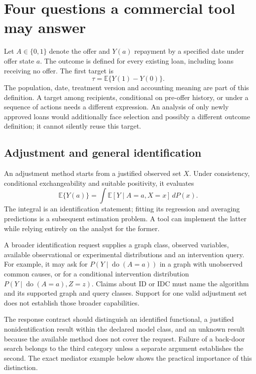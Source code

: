 \section{Four questions a commercial tool may answer}

Let $A\in\{0,1\}$ denote the offer and $Y(a)$ repayment by a specified date
under offer state $a$. The outcome is defined for every existing loan, including
loans receiving no offer. The first target is
\[
 \tau=\mathbb E\{Y(1)-Y(0)\}.
\]
The population, date, treatment version and accounting meaning are part of
this definition. A target among recipients, conditional on pre-offer history,
or under a sequence of actions needs a different expression. An analysis of
only newly approved loans would additionally face selection and possibly a
different outcome definition; it cannot silently reuse this target.

\subsection{Adjustment and general identification}

An adjustment method starts from a justified observed set $X$. Under consistency,
conditional exchangeability and suitable positivity, it evaluates
\[
 \mathbb E\{Y(a)\}
 =\int \mathbb E[Y\mid A=a,X=x]\,dP(x).
\]
The integral is an identification statement; fitting its regression and
averaging predictions is a subsequent estimation problem. A tool can implement
the latter while relying entirely on the analyst for the former.

A broader identification request supplies a graph class, observed variables,
available observational or experimental distributions and an intervention query.
For example, it may ask for $P(Y\mid\operatorname{do}(A=a))$ in a graph with
unobserved common causes, or for a conditional intervention distribution
$P(Y\mid\operatorname{do}(A=a),Z=z)$. Claims about ID or IDC must name the
algorithm and its supported graph and query classes. Support for one valid
adjustment set does not establish those broader capabilities.

The response contract should distinguish an identified functional, a justified
nonidentification result within the declared model class, and an unknown result
because the available method does not cover the request. Failure of a
back-door search belongs to the third category unless a separate argument
establishes the second. The exact mediator example below shows the practical
importance of this distinction.

